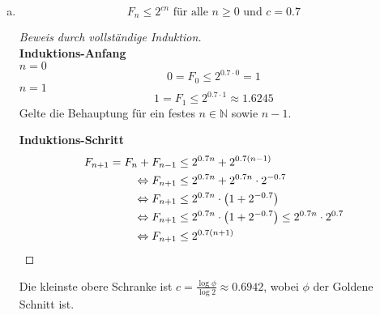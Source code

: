 \documentclass[a4paper]{scrartcl}
\begin{document}
\begin{enumerate}[(a)]
    \item
        \begin{behaupt}
            \begin{equation}
                F_n \leq 2^{cn} \text{ für alle } n \geq 0 \text{ und } c = \num{0,7}
            \end{equation}
        \end{behaupt}
        \begin{proof}[Beweis durch vollständige Induktion] \hfill \\
            \textbf{Induktions-Anfang}\\
            $n = 0$
            \begin{equation}
                0 = F_0 \leq 2^{\num{0.7} \cdot 0} = 1
            \end{equation}
            $n = 1$
            \begin{equation}
                1 = F_1 \leq 2^{\num{0.7} \cdot 1} \approx \num{1.6245}
            \end{equation}
            Gelte die Behauptung für ein festes $n \in \mathbb{N}$ sowie $n-1$.

            \textbf{Induktions-Schritt} \\
            \begin{equation}
                \begin{split}
                    F_{n+1} = F_n + F_{n-1} &\leq 2^{\num{0,7}n} + 2^{\num{0,7}(n-1)} \\
                    \Leftrightarrow F_{n+1} &\leq 2^{\num{0,7}n} + 2^{\num{0,7}n} \cdot 2^{\num{-0,7}} \\
                    \Leftrightarrow F_{n+1} &\leq 2^{\num{0,7}n} \cdot \left( 1 + 2^{\num{-0,7}} \right) \\
                    \Leftrightarrow F_{n+1} &\leq 2^{\num{0,7}n} \cdot \left( 1 + 2^{\num{-0,7}} \right) \leq 2^{\num{0,7}n} \cdot 2^{\num{0,7}} \\
                    \Leftrightarrow F_{n+1} &\leq 2^{\num{0,7}(n+1)} \\
                \end{split}
            \end{equation}
        \end{proof}
        Die kleinste obere Schranke ist
        $c = \frac{\log \phi}{\log 2} \approx \num{0.6942}$,
        wobei $\phi$ der Goldene Schnitt ist.
\end{enumerate}
\end{document}
